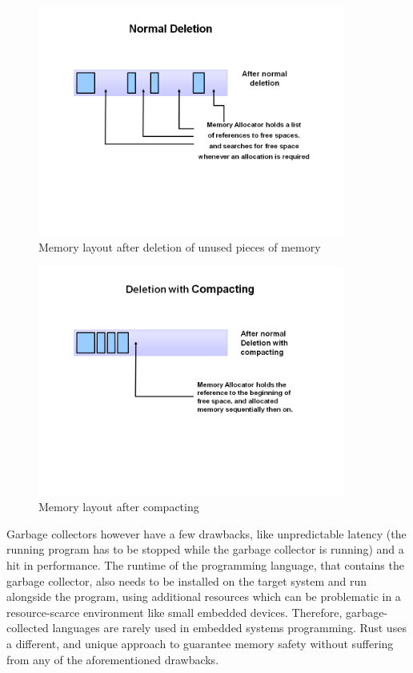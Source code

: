 \begin{figure}[htb]
    \centering
    \includegraphics[width=0.9\textwidth]{figures/fundamentals_garbage_collector_deletion.PNG}
    \caption[Illustration: Garbage Collector deleting marked memory \cite{java_garbage_collector}]{Memory layout after deletion of unused pieces of memory}
    \label{fig:gc_delete}
\end{figure}

\begin{figure}[H]
    \centering
    \includegraphics[width=0.9\textwidth]{figures/fundamentals_garbage_collector_compacting.PNG}
    \caption[Illustration: Garbage Collector compacting memory \cite{java_garbage_collector}]{Memory layout after compacting}
    \label{fig:gc_compact}
\end{figure}

Garbage collectors however have a few drawbacks, like unpredictable latency (the running program has to be stopped while the garbage collector is running) and a hit in performance.
The runtime of the programming language, that contains the garbage collector, also needs to be installed on the target system and run alongside the program, using additional
resources which can be problematic in a resource-scarce environment like small embedded devices.
Therefore, garbage-collected languages are rarely used in embedded systems programming.
Rust uses a different, and unique approach to guarantee memory safety without suffering from any of the aforementioned drawbacks.

